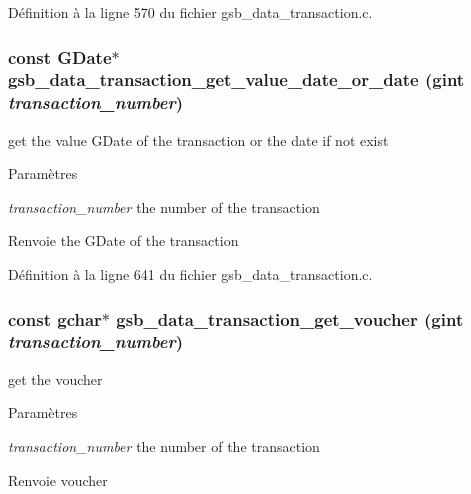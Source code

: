Définition à la ligne 570 du fichier gsb\_\-data\_\-transaction.c.

\subsubsection[{gsb\_\-data\_\-transaction\_\-get\_\-value\_\-date\_\-or\_\-date}]{\setlength{\rightskip}{0pt plus 5cm}const GDate$\ast$ gsb\_\-data\_\-transaction\_\-get\_\-value\_\-date\_\-or\_\-date (gint {\em transaction\_\-number})}\label{gsb__data__transaction_8h_ab576cdbff4a0fdea4fbcbfed6d0a1669}
get the value GDate of the transaction or the date if not exist


\begin{DoxyParams}{Paramètres}
\item[{\em transaction\_\-number}]the number of the transaction\end{DoxyParams}
\begin{DoxyReturn}{Renvoie}
the GDate of the transaction 
\end{DoxyReturn}


Définition à la ligne 641 du fichier gsb\_\-data\_\-transaction.c.

\subsubsection[{gsb\_\-data\_\-transaction\_\-get\_\-voucher}]{\setlength{\rightskip}{0pt plus 5cm}const gchar$\ast$ gsb\_\-data\_\-transaction\_\-get\_\-voucher (gint {\em transaction\_\-number})}\label{gsb__data__transaction_8h_ad9886b09c3afc57a5c551896046a849a}
get the voucher 
\begin{DoxyParams}{Paramètres}
\item[{\em transaction\_\-number}]the number of the transaction \end{DoxyParams}
\begin{DoxyReturn}{Renvoie}
voucher 
\end{DoxyReturn}


